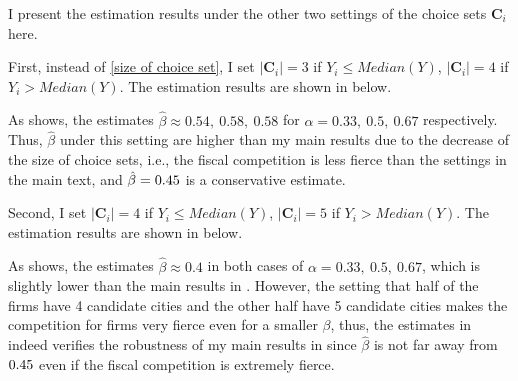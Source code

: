 I present the estimation results under the other two settings of the choice sets $\mathbf{C}_i$ here.

First, instead of \eqref{size of choice set}, I set $|\mathbf{C}_i| = 3$ if
$Y_i \leq Median(Y)$, $|\mathbf{C}_i| = 4$ if $Y_i > Median(Y)$. The estimation results
are shown in  below.



As  shows, the estimates
$\hat{\beta} \approx 0.54, ~0.58, ~0.58$
for $\alpha = 0.33, ~0.5, ~0.67$ respectively.
Thus, $\hat{\beta}$ under this setting are higher than my main results due to the decrease
of the size of choice sets, i.e., the fiscal competition is less fierce than the settings
in the main text, and $\hat{\beta} = 0.45$ is a conservative estimate.


Second, I set $|\mathbf{C}_i| = 4$ if
$Y_i \leq Median(Y)$, $|\mathbf{C}_i| = 5$ if $Y_i > Median(Y)$. The estimation results
are shown in  below.



As  shows,
the estimates $\hat{\beta} \approx 0.4$
in both cases of $\alpha = 0.33, ~0.5, ~0.67$, which is slightly lower than the main results
in . However, the setting that
half of the firms have 4 candidate cities and the other half have 5 candidate cities
makes the competition for firms very fierce even for a smaller $\beta$, thus, the estimates in
 indeed
verifies the robustness of my main results
in  since $\hat{\beta}$
is not far away from $0.45$ even if the fiscal competition is extremely fierce.

